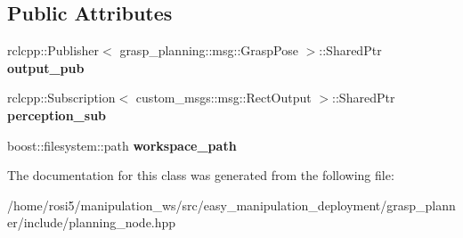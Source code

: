 \subsection*{Public Attributes}
\begin{DoxyCompactItemize}
\item 
\mbox{\label{classGraspPlanNode_a99e4b6352bbd275386e0fe30ad8fd044}} 
rclcpp\+::\+Publisher$<$ grasp\+\_\+planning\+::msg\+::\+Grasp\+Pose $>$\+::Shared\+Ptr {\bfseries output\+\_\+pub}
\item 
\mbox{\label{classGraspPlanNode_a5852a260a5545931888a17b4ee15840e}} 
rclcpp\+::\+Subscription$<$ custom\+\_\+msgs\+::msg\+::\+Rect\+Output $>$\+::Shared\+Ptr {\bfseries perception\+\_\+sub}
\item 
\mbox{\label{classGraspPlanNode_acddf7dd4bb3f39ab673a1e380ed2303e}} 
boost\+::filesystem\+::path {\bfseries workspace\+\_\+path}
\end{DoxyCompactItemize}


The documentation for this class was generated from the following file\+:\begin{DoxyCompactItemize}
\item 
/home/rosi5/manipulation\+\_\+ws/src/easy\+\_\+manipulation\+\_\+deployment/grasp\+\_\+planner/include/planning\+\_\+node.\+hpp\end{DoxyCompactItemize}
